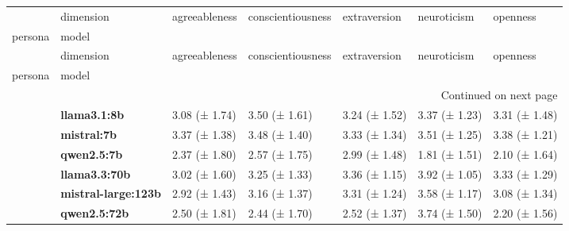\begin{longtable}{lllllll}
\toprule
 & dimension & agreeableness & conscientiousness & extraversion & neuroticism & openness \\
persona & model &  &  &  &  &  \\
\midrule
\endfirsthead
\toprule
 & dimension & agreeableness & conscientiousness & extraversion & neuroticism & openness \\
persona & model &  &  &  &  &  \\
\midrule
\endhead
\midrule
\multicolumn{7}{r}{Continued on next page} \\
\midrule
\endfoot
\bottomrule
\endlastfoot
\multirow[t]{6}{*}{\textbf{base}} & \textbf{llama3.1:8b} & 3.08 (± 1.74) & 3.50 (± 1.61) & 3.24 (± 1.52) & 3.37 (± 1.23) & 3.31 (± 1.48) \\
\textbf{} & \textbf{mistral:7b} & 3.37 (± 1.38) & 3.48 (± 1.40) & 3.33 (± 1.34) & 3.51 (± 1.25) & 3.38 (± 1.21) \\
\textbf{} & \textbf{qwen2.5:7b} & 2.37 (± 1.80) & 2.57 (± 1.75) & 2.99 (± 1.48) & 1.81 (± 1.51) & 2.10 (± 1.64) \\
\textbf{} & \textbf{llama3.3:70b} & 3.02 (± 1.60) & 3.25 (± 1.33) & 3.36 (± 1.15) & 3.92 (± 1.05) & 3.33 (± 1.29) \\
\textbf{} & \textbf{mistral-large:123b} & 2.92 (± 1.43) & 3.16 (± 1.37) & 3.31 (± 1.24) & 3.58 (± 1.17) & 3.08 (± 1.34) \\
\textbf{} & \textbf{qwen2.5:72b} & 2.50 (± 1.81) & 2.44 (± 1.70) & 2.52 (± 1.37) & 3.74 (± 1.50) & 2.20 (± 1.56) \\
\cline{1-7}
\end{longtable}

